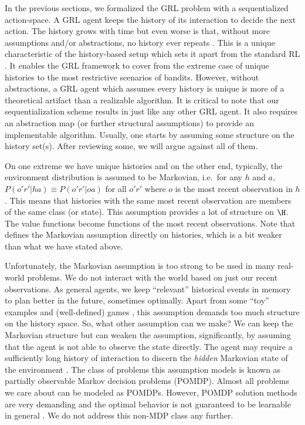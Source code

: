 \documentclass{article} %
\begin{document}
In the previous sections, we formalized the GRL problem with a sequentialized action-space. A GRL agent keeps the history of its interaction to decide the next action. The history grows with time but even worse is that, without more assumptions and/or abstractions, no history ever repeats \cite{Hutter2009}. This is a unique characteristic of the history-based setup which sets it apart from the standard RL \cite{Sutton2018}. It enables the GRL framework to cover from the extreme case of unique histories to the most restrictive scenarios of bandits. However, without abstractions, a GRL agent which assumes every history is unique is more of a theoretical artifact than a realizable algorithm. It is critical to note that our sequentialization scheme results in just like any other GRL agent. It also requires an abstraction map (or further structural assumptions) to provide an implementable algorithm. Usually, one starts by assuming some structure on the history set(s). After reviewing some, we will argue against all of them.

On one extreme we have unique histories and on the other end, typically, the environment distribution is assumed to be Markovian, i.e.\ for any $h$ and $a$, $P(o'r'|ha) \equiv P(o'r'|oa)$ for all $o'r'$ where $o$ is the most recent observation in $h$ \cite{Sutton2018}. This means that histories with the same most recent observation are members of the same class (or state).
This assumption provides a lot of structure on $\H$. The value functions become functions of the most recent observations. Note that \citet{Hutter2016} defines the Markovian assumption directly on histories, which is a bit weaker than what we have stated above.

Unfortunately, the Markovian assumption is too strong to be used in many real-world problems. We do not interact with the world based on just our recent observations. As general agents, we keep ``relevant'' historical events in memory to plan better in the future, sometimes optimally. Apart from some ``toy'' examples and (well-defined) games \cite{Mnih2015,Silver2016,Silver2018}, this assumption demands too much structure on the history space. So, what other assumption can we make? We can keep the Markovian structure but can weaken the assumption, significantly, by assuming that the agent is not able to observe the state directly. The agent may require a sufficiently long history of interaction to discern the \emph{hidden} Markovian state of the environment \cite{Kaelbling1998}. The class of problems this assumption models is known as partially observable Markov decision problems (POMDP). Almost all problems we care about can be modeled as POMDPs. However, POMDP solution methods are very demanding and the optimal behavior is not guaranteed to be learnable in general \cite{Pendrith1998}. We do not address this non-MDP class any further.
\end{document}
